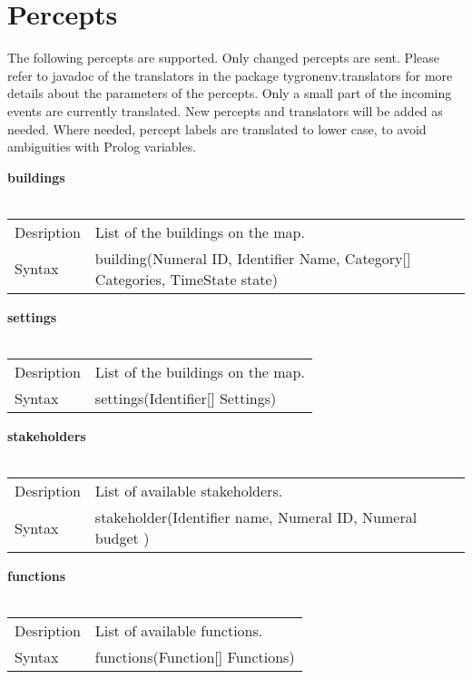 \documentclass[english,11pt]{article}
\begin{document}
\section{Percepts}

The following percepts are supported. Only changed percepts are sent. Please refer to javadoc of the translators in the package tygronenv.translators for more details about the parameters of the percepts. Only a small part of the incoming events are currently translated. New percepts and translators will be added as needed. Where needed, percept labels are translated to lower case, to avoid ambiguities with Prolog variables.
\newline


\textbf{buildings}\\
\\
\begin{tabularx}{\textwidth}{lX}
 Desription & List of the buildings on the map. \\
 Syntax & building(Numeral ID, Identifier Name, Category[] Categories, TimeState state) \\
\end{tabularx}
\newline

\textbf{settings}\\
\\
\begin{tabularx}{\textwidth}{lX}
 Desription & List of the buildings on the map. \\
 Syntax & settings(Identifier[] Settings) \\
\end{tabularx}
\newline

\textbf{stakeholders}\\
\\
\begin{tabularx}{\textwidth}{lX}
 Desription & List of available stakeholders. \\
 Syntax & stakeholder(Identifier name, Numeral ID, Numeral budget ) \\
\end{tabularx}
\newline

\textbf{functions}\\
\\
\begin{tabularx}{\textwidth}{lX}
 Desription & List of available functions. \\
 Syntax & functions(Function[] Functions) \\
\end{tabularx}
\newline
\end{document}
